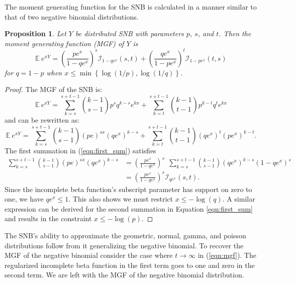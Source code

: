 \documentclass[review]{elsarticle}
\newtheorem{prop}{Proposition}
\begin{document}
The moment generating function for the SNB is calculated in a manner similar to 
that of two negative binomial distributions. 
\begin{prop} Let $Y$ be distributed SNB with parameters $p$, $s$, and $t$.
Then the moment generating function (MGF) of $Y$ is
\begin{equation} \label{eqn:mgf}
\mathbb{E}~e^{xY} = \left(\frac{p e^x}{1 - qe^x}\right)^s 
  \mathcal{I}_{1-qe^x} (s, t) + \left(\frac{qe^x}{1-pe^x}\right)^t 
  \mathcal{I}_{1-pe^x}(t, s)
\end{equation}
for $q = 1-p$ when $x \leq \min \left\{\log(1/p), \log(1/q) \right\}$.
\end{prop}
\begin{proof}
The MGF of the SNB is:
\begin{equation*}
\mathbb{E}~e^{xY} = \sum_{k=s}^{s+t-1} {k-1 \choose s-1} p^s q^{k-s} e^{kx} 
  + \sum_{k=t}^{s+t-1} {k-1 \choose t-1} p^{k-t} q^t e^{kx}
\end{equation*}
and can be rewritten as:
\begin{equation} \label{eqn:first_sum}
\mathbb{E}~e^{xY} = \sum_{k=s}^{s+t-1}{k-1 \choose s-1} (pe)^{sx} (qe^x)^{k-s} 
  + \sum_{k=t}^{s+t-1}{k-1 \choose t-1} (qe^x)^t (pe^x)^{k-t}.
\end{equation}
The first summation in (\ref{eqn:first_sum}) satisfies
\begin{align*}
\sum_{k=s}^{s+t-1}{k-1 \choose s-1} (pe)^{sx} (qe^x)^{k-s} &= 
  \left(\frac{pe^x}{1 - qe^x}\right)^s \ \ \sum_{k=s}^{s+t-1} {k-1 \choose s-1} 
    (qe^x)^{k-s} (1-qe^x)^s \\
  &= \left(\frac{pe^x}{1 - qe^x}\right)^s \mathcal{I}_{qe^x}(s, t).
\end{align*}
Since the incomplete beta function's subscript parameter has support on zero 
to one, we have $qe^x \leq 1$. This also shows we must restrict
$x \leq -\log(q)$.
A similar expression can be derived for the second summation in 
Equation \ref{eqn:first_sum} and results in
the constraint $x \leq -\log(p)$.
\end{proof}

The SNB's ability to approximate the geometric, normal, gamma, and poisson
distributions follow from it generalizing the negative binomial. To 
recover the MGF of the negative binomial consider the case where
$t \rightarrow \infty$ in (\ref{eqn:mgf}). The regularized incomplete
beta function in the first term goes to one and zero in the second term.
We are left with the MGF of the negative binomial distribution. 
\end{document}
